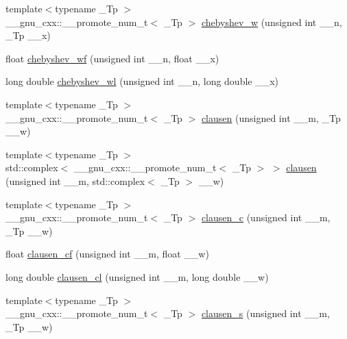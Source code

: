 \begin{DoxyCompactItemize}
\item 
{\footnotesize template$<$typename \+\_\+\+Tp $>$ }\\\+\_\+\+\_\+gnu\+\_\+cxx\+::\+\_\+\+\_\+promote\+\_\+num\+\_\+t$<$ \+\_\+\+Tp $>$ \hyperlink{namespace____gnu__cxx_ae283d165c5a058fff7a0f83a2a66b4c2}{chebyshev\+\_\+w} (unsigned int \+\_\+\+\_\+n, \+\_\+\+Tp \+\_\+\+\_\+x)
\item 
float \hyperlink{namespace____gnu__cxx_ae6d468cee53df584e40afe294127b090}{chebyshev\+\_\+wf} (unsigned int \+\_\+\+\_\+n, float \+\_\+\+\_\+x)
\item 
long double \hyperlink{namespace____gnu__cxx_a1297dfd9b9a0f584435de7d83eb9e9c3}{chebyshev\+\_\+wl} (unsigned int \+\_\+\+\_\+n, long double \+\_\+\+\_\+x)
\item 
{\footnotesize template$<$typename \+\_\+\+Tp $>$ }\\\+\_\+\+\_\+gnu\+\_\+cxx\+::\+\_\+\+\_\+promote\+\_\+num\+\_\+t$<$ \+\_\+\+Tp $>$ \hyperlink{namespace____gnu__cxx_a5a7016834baf2dd1b57c9dfcfa3436f0}{clausen} (unsigned int \+\_\+\+\_\+m, \+\_\+\+Tp \+\_\+\+\_\+w)
\item 
{\footnotesize template$<$typename \+\_\+\+Tp $>$ }\\std\+::complex$<$ \+\_\+\+\_\+gnu\+\_\+cxx\+::\+\_\+\+\_\+promote\+\_\+num\+\_\+t$<$ \+\_\+\+Tp $>$ $>$ \hyperlink{namespace____gnu__cxx_a154f5baa4a7799557b7e7d32dfc73285}{clausen} (unsigned int \+\_\+\+\_\+m, std\+::complex$<$ \+\_\+\+Tp $>$ \+\_\+\+\_\+w)
\item 
{\footnotesize template$<$typename \+\_\+\+Tp $>$ }\\\+\_\+\+\_\+gnu\+\_\+cxx\+::\+\_\+\+\_\+promote\+\_\+num\+\_\+t$<$ \+\_\+\+Tp $>$ \hyperlink{namespace____gnu__cxx_a2e89f9758322054738dacf686f6ce974}{clausen\+\_\+c} (unsigned int \+\_\+\+\_\+m, \+\_\+\+Tp \+\_\+\+\_\+w)
\item 
float \hyperlink{namespace____gnu__cxx_a515b9b6bca8f97e696ac5be85a44b3bd}{clausen\+\_\+cf} (unsigned int \+\_\+\+\_\+m, float \+\_\+\+\_\+w)
\item 
long double \hyperlink{namespace____gnu__cxx_a5ff89833dc529ca3de5099e1b9c8525f}{clausen\+\_\+cl} (unsigned int \+\_\+\+\_\+m, long double \+\_\+\+\_\+w)
\item 
{\footnotesize template$<$typename \+\_\+\+Tp $>$ }\\\+\_\+\+\_\+gnu\+\_\+cxx\+::\+\_\+\+\_\+promote\+\_\+num\+\_\+t$<$ \+\_\+\+Tp $>$ \hyperlink{namespace____gnu__cxx_a124827c09e71d83eb11b9e3282739475}{clausen\+\_\+s} (unsigned int \+\_\+\+\_\+m, \+\_\+\+Tp \+\_\+\+\_\+w)

\end{DoxyCompactItemize}
